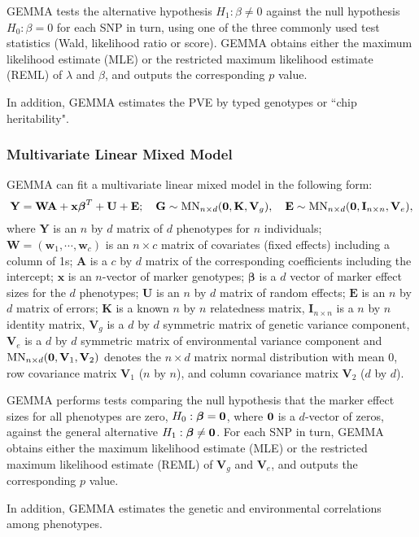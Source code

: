 \documentclass[11pt]{article}
\newcommand{\bx}{\mathbf{x}}
\newcommand{\bw}{\mathbf{w}}
\newcommand{\bK}{\mathbf{K}}
\newcommand{\bV}{\mathbf{V}}
\newcommand{\bA}{\mathbf{A}}
\newcommand{\bY}{\mathbf{Y}}
\newcommand{\bE}{\mathbf{E}}
\newcommand{\bG}{\mathbf{G}}
\newcommand{\bW}{\mathbf{W}}
\newcommand{\bU}{\mathbf{U}}
\newcommand{\bI}{\mathbf{I}}
\newcommand{\bbeta}{\boldsymbol\beta}
\begin{document}
GEMMA tests the alternative hypothesis $H_1: \beta\neq 0$ against the
null hypothesis $H_0: \beta=0$ for each SNP in turn, using one of the
three commonly used test statistics (Wald, likelihood ratio or
score). GEMMA obtains either the maximum likelihood estimate (MLE) or
the restricted maximum likelihood estimate (REML) of $\lambda$ and
$\beta$, and outputs the corresponding $p$ value.

In addition, GEMMA estimates the PVE by typed genotypes or ``chip
heritability".

\subsubsection{Multivariate Linear Mixed Model}
GEMMA can fit a multivariate linear mixed model in the following form:
%
\begin{equation*}
\bY = \bW \bA+\bx\bbeta^T+\bU+\bE;  \quad
\bG \sim \mbox{MN}_{n \times d}({\bf 0}, \bK, \bV_g),
\quad \bE \sim \mbox{MN}_{n \times d}({\bf 0}, \bI_{n\times n}, \bV_e),
\end{equation*}
%
where $\bY$ is an $n$ by $d$ matrix of $d$ phenotypes for $n$
individuals; $\bW=(\bw_1, \cdots, \bw_c)$ is an $n\times c$ matrix of
covariates (fixed effects) including a column of 1s; $\bA$ is a $c$ by
$d$ matrix of the corresponding coefficients including the intercept;
$\bx$ is an $n$-vector of marker genotypes; $\bbeta$ is a $d$ vector
of marker effect sizes for the $d$ phenotypes; $\bU$ is an $n$ by $d$
matrix of random effects; $\bE$ is an $n$ by $d$ matrix of errors;
$\bK$ is a known $n$ by $n$ relatedness matrix, $\bI_{n\times n}$ is a
$n$ by $n$ identity matrix, $\bV_g$ is a $d$ by $d$ symmetric matrix
of genetic variance component, $\bV_e$ is a $d$ by $d$ symmetric
matrix of environmental variance component and $\mbox{MN}_{n \times
  d}({\bf 0}, \bV_1, \bV_2)$ denotes the $n \times d$ matrix normal
distribution with mean 0, row covariance matrix $\bV_1$ ($n$ by $n$),
and column covariance matrix $\bV_2$ ($d$ by $d$).

GEMMA performs tests comparing the null hypothesis that the marker
effect sizes for all phenotypes are zero, $H_0: \bbeta= {\bf 0}$,
where ${\bf 0}$ is a $d$-vector of zeros, against the general
alternative $H_1: \bbeta\neq {\bf 0}$. For each SNP in turn, GEMMA
obtains either the maximum likelihood estimate (MLE) or the restricted
maximum likelihood estimate (REML) of $\bV_g$ and $\bV_e$, and outputs
the corresponding $p$ value.

In addition, GEMMA estimates the genetic and environmental
correlations among phenotypes.
\end{document}
